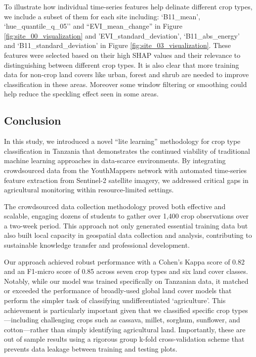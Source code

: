 \documentclass[
  journal,
  twocolumn]{IEEEtran}
\begin{document}
To illustrate how individual time-series features help delinate
different crop types, we include a subset of them for each site
including: `B11\_mean', `hue\_quantile\_q\_05'' and
``EVI\_mean\_change'' in Figure \ref{fig:site_00_visualization} and
'EVI\_standard\_deviation', `B11\_abs\_energy' and
`B11\_standard\_deviation' in Figure \ref{fig:site_03_visualization}.
These features were selected based on their high SHAP values and their
relevance to distinguishing between different crop types. It is also
clear that more training data for non-crop land covers like urban,
forest and shrub are needed to improve classification in these areas.
Moreover some window filtering or smoothing could help reduce the
speckling effect seen in some areas.

\hypertarget{conclusion}{%
\subsection{Conclusion}\label{conclusion}}

In this study, we introduced a novel ``lite learning'' methodology for
crop type classification in Tanzania that demonstrates the continued
viability of traditional machine learning approaches in data-scarce
environments. By integrating crowdsourced data from the YouthMappers
network with automated time-series feature extraction from Sentinel-2
satellite imagery, we addressed critical gaps in agricultural monitoring
within resource-limited settings.

The crowdsourced data collection methodology proved both effective and
scalable, engaging dozens of students to gather over 1,400 crop
observations over a two-week period. This approach not only generated
essential training data but also built local capacity in geospatial data
collection and analysis, contributing to sustainable knowledge transfer
and professional development.

Our approach achieved robust performance with a Cohen's Kappa score of
0.82 and an F1-micro score of 0.85 across seven crop types and six land
cover classes. Notably, while our model was trained specifically on
Tanzanian data, it matched or exceeded the performance of broadly-used
global land cover models that perform the simpler task of classifying
undifferentiated `agriculture'. This achievement is particularly
important given that we classified specific crop types---including
challenging crops such as cassava, millet, sorghum, sunflower, and
cotton---rather than simply identifying agricultural land. Importantly,
these are out of sample results using a rigorous group k-fold
cross-validation scheme that prevents data leakage between training and
testing plots.
\end{document}

